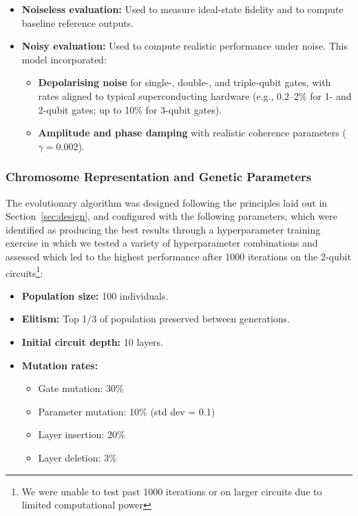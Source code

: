 \documentclass[11pt,a4paper]{article}
\begin{document}
\begin{itemize}
    \item \textbf{Noiseless evaluation:} Used to measure ideal-state fidelity and to compute baseline reference outputs.
    \item \textbf{Noisy evaluation:} Used to compute realistic performance under noise. This model incorporated:
    \begin{itemize}
        \item \textbf{Depolarising noise} for single-, double-, and triple-qubit gates, with rates aligned to typical superconducting hardware (e.g., 0.2--2\% for 1- and 2-qubit gates; up to 10\% for 3-qubit gates).
        \item \textbf{Amplitude and phase damping} with realistic coherence parameters ($\gamma = 0.002$).
    \end{itemize}
\end{itemize}

\subsubsection*{Chromosome Representation and Genetic Parameters}
The evolutionary algorithm was designed following the principles laid out in Section~\ref{sec:design}, and configured with the following parameters, which were identified as producing the best results through a hyperparameter training exercise in which we tested a variety of hyperparameter combinations and assessed which led to the highest performance after 1000 iterations on the 2-qubit circuits\footnote{We were unable to test past 1000 iterations or on larger circuits due to limited computational power}:

\begin{itemize}
    \item \textbf{Population size:} 100 individuals.
    \item \textbf{Elitism:} Top 1/3 of population preserved between generations.
    \item \textbf{Initial circuit depth:} 10 layers.
    \item \textbf{Mutation rates:}
    \begin{itemize}
        \item Gate mutation: 30\%
        \item Parameter mutation: 10\% (std dev = 0.1)
        \item Layer insertion: 20\%
        \item Layer deletion: 3\%
    \end{itemize}
\end{itemize}
\end{document}
